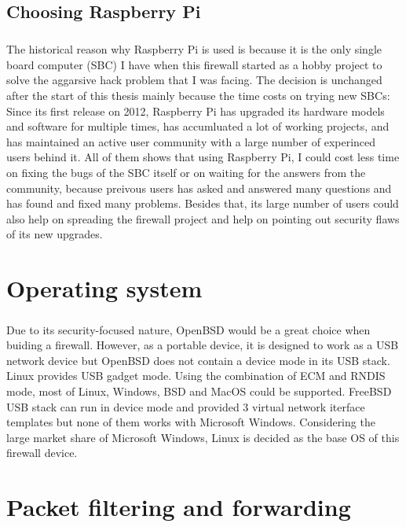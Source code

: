 \documentclass[mscthesis]{usiinfthesis}
\begin{document}
\section{Choosing Raspberry Pi}
\paragraph{}
The historical reason why Raspberry Pi is used is because it is the only single board computer (SBC) I have when this firewall started as a hobby project to solve the aggarsive hack problem that I was facing. The decision is unchanged after the start of this thesis mainly because the time costs on trying new SBCs: Since its first release on 2012, Raspberry Pi has upgraded its hardware models and software for multiple times, has accumluated a lot of working projects, and has maintained an active user community with a large number of experinced users behind it. All of them shows that using Raspberry Pi, I could cost less time on fixing the bugs of the SBC itself or on waiting for the answers from the community, because preivous users has asked and answered many questions and has found and fixed many problems. Besides that, its large number of users could also help on spreading the firewall project and help on pointing out security flaws of its new upgrades.

\chapter{Operating system}
\paragraph{}
Due to its security-focused nature, OpenBSD would be a great choice when buiding a firewall. However, as a portable device, it is designed to work as a USB network device but OpenBSD does not contain a device mode in its USB stack. Linux provides USB gadget mode. Using the combination of ECM and RNDIS mode, most of Linux, Windows, BSD and MacOS could be supported. FreeBSD USB stack can run in device mode and provided 3 virtual network iterface templates but none of them works with Microsoft Windows\citep{freebsdhb:usb}. Considering the large market share of Microsoft Windows, Linux is decided as the base OS of this firewall device.

\chapter{Packet filtering and forwarding}
\end{document}
